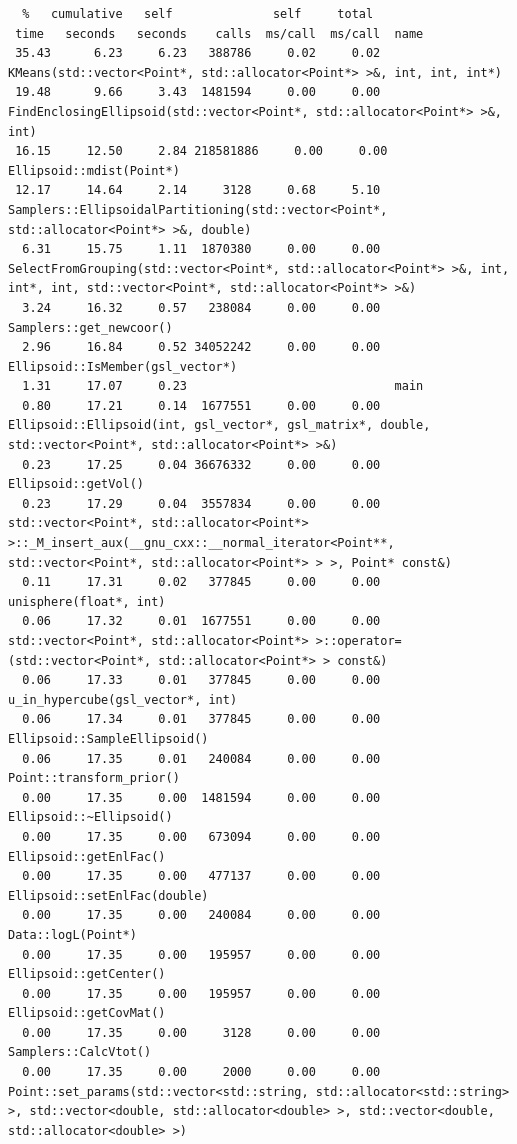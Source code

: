 \documentclass{article}
\begin{document}
\begin{verbatim}
  %   cumulative   self              self     total           
 time   seconds   seconds    calls  ms/call  ms/call  name    
 35.43      6.23     6.23   388786     0.02     0.02  KMeans(std::vector<Point*, std::allocator<Point*> >&, int, int, int*)
 19.48      9.66     3.43  1481594     0.00     0.00  FindEnclosingEllipsoid(std::vector<Point*, std::allocator<Point*> >&, int)
 16.15     12.50     2.84 218581886     0.00     0.00  Ellipsoid::mdist(Point*)
 12.17     14.64     2.14     3128     0.68     5.10  Samplers::EllipsoidalPartitioning(std::vector<Point*, std::allocator<Point*> >&, double)
  6.31     15.75     1.11  1870380     0.00     0.00  SelectFromGrouping(std::vector<Point*, std::allocator<Point*> >&, int, int*, int, std::vector<Point*, std::allocator<Point*> >&)
  3.24     16.32     0.57   238084     0.00     0.00  Samplers::get_newcoor()
  2.96     16.84     0.52 34052242     0.00     0.00  Ellipsoid::IsMember(gsl_vector*)
  1.31     17.07     0.23                             main
  0.80     17.21     0.14  1677551     0.00     0.00  Ellipsoid::Ellipsoid(int, gsl_vector*, gsl_matrix*, double, std::vector<Point*, std::allocator<Point*> >&)
  0.23     17.25     0.04 36676332     0.00     0.00  Ellipsoid::getVol()
  0.23     17.29     0.04  3557834     0.00     0.00  std::vector<Point*, std::allocator<Point*> >::_M_insert_aux(__gnu_cxx::__normal_iterator<Point**, std::vector<Point*, std::allocator<Point*> > >, Point* const&)
  0.11     17.31     0.02   377845     0.00     0.00  unisphere(float*, int)
  0.06     17.32     0.01  1677551     0.00     0.00  std::vector<Point*, std::allocator<Point*> >::operator=(std::vector<Point*, std::allocator<Point*> > const&)
  0.06     17.33     0.01   377845     0.00     0.00  u_in_hypercube(gsl_vector*, int)
  0.06     17.34     0.01   377845     0.00     0.00  Ellipsoid::SampleEllipsoid()
  0.06     17.35     0.01   240084     0.00     0.00  Point::transform_prior()
  0.00     17.35     0.00  1481594     0.00     0.00  Ellipsoid::~Ellipsoid()
  0.00     17.35     0.00   673094     0.00     0.00  Ellipsoid::getEnlFac()
  0.00     17.35     0.00   477137     0.00     0.00  Ellipsoid::setEnlFac(double)
  0.00     17.35     0.00   240084     0.00     0.00  Data::logL(Point*)
  0.00     17.35     0.00   195957     0.00     0.00  Ellipsoid::getCenter()
  0.00     17.35     0.00   195957     0.00     0.00  Ellipsoid::getCovMat()
  0.00     17.35     0.00     3128     0.00     0.00  Samplers::CalcVtot()
  0.00     17.35     0.00     2000     0.00     0.00  Point::set_params(std::vector<std::string, std::allocator<std::string> >, std::vector<double, std::allocator<double> >, std::vector<double, std::allocator<double> >)

\end{verbatim}
\end{document}
